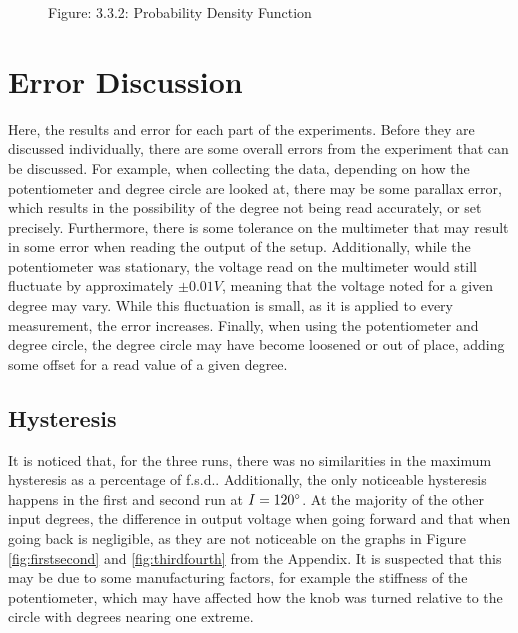 \documentclass[a4,11pt]{article}
\begin{document}
\begin{figure}[H]
	\centering
	\label{fig:probdens}
	Figure: 3.3.2: Probability Density Function
\end{figure}

\section{Error Discussion}
Here, the results and error for each part of the experiments. Before they are discussed individually, there are some overall errors from the experiment that can be discussed. For example, when collecting the data, depending on how the potentiometer and degree circle are looked at, there may be some parallax error, which results in the possibility of the degree not being read accurately, or set precisely. Furthermore, there is some tolerance on the multimeter that may result in some error when reading the output of the setup. Additionally, while the potentiometer was stationary, the voltage read on the multimeter would still fluctuate by approximately $\pm0.01V$, meaning that the voltage noted for a given degree may vary. While this fluctuation is small, as it is applied to every measurement, the error increases. Finally, when using the potentiometer and degree circle, the degree circle may have become loosened or out of place, adding some offset for a read value of a given degree.
\subsection{Hysteresis}
It is noticed that, for the three runs, there was no similarities in the maximum hysteresis as a percentage of f.s.d.. Additionally, the only noticeable hysteresis happens in the first and second run at $I=120\degree$. At the majority of the other input degrees, the difference in output voltage when going forward and that when going back is negligible, as they are not noticeable on the graphs in Figure \ref{fig:firstsecond} and \ref{fig:thirdfourth} from the Appendix. It is suspected that this may be due to some manufacturing factors, for example the stiffness of the potentiometer, which may have affected how the knob was turned relative to the circle with degrees nearing one extreme.
\end{document}
